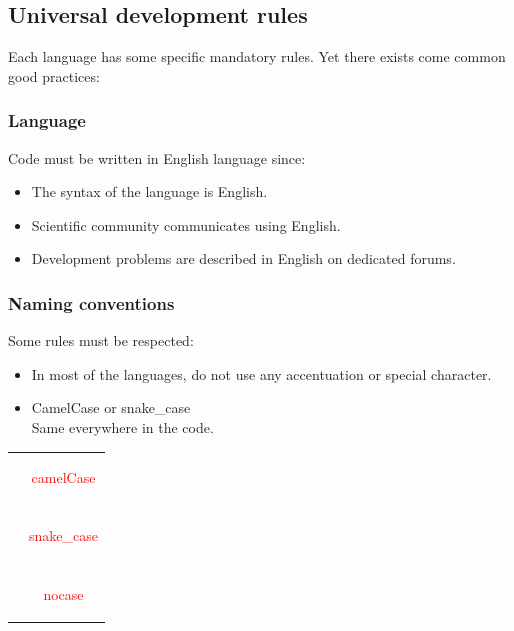 \documentclass[11pt]{article}
\begin{document}
		\subsection{Universal development rules}
			Each language has some specific mandatory rules. Yet there exists come common good practices:

			\subsubsection{Language}
                Code must be written in English language since:
				\begin{itemize}
					\setlength\itemsep{0pt}
					\item The syntax of the language is English.
					\item Scientific community communicates using English.
					\item Development problems are described in English on dedicated forums.
				\end{itemize}

			\subsubsection{Naming conventions}
				\begin{minipage}{0.75\textwidth}
					Some rules must be respected:
					\begin{itemize}
						\setlength\itemsep{0pt}

						\item In most of the languages, do not use any accentuation or special character.
						\item CamelCase or snake\_case \\
						Same everywhere in the code.
					\end{itemize}
				\end{minipage}
				\begin{minipage}{0.55\textwidth}
					\begin{tabular}{cc}
						& \begin{huge}
							  \textcolor{red}{camelCase}
						\end{huge} \\
						\\
						& \begin{huge}
							  \textcolor{red}{snake\_case}
						\end{huge} \\
						\\
						& \begin{huge}
							  \textcolor{red}{nocase}
						\end{huge}                               \\
					\end{tabular}
				\end{minipage}
\end{document}
